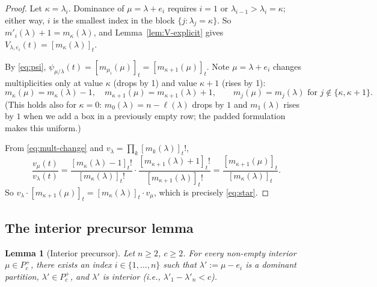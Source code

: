\documentclass[11pt]{article}
\newtheorem{lemma}[theorem]{Lemma}
\theoremstyle{definition}
\newcommand{\Pcp}{P_c^+}
\begin{document}
\begin{proof}
Let $\kappa = \lambda_i$. Dominance of $\mu = \lambda + e_i$ requires $i = 1$
or $\lambda_{i-1} > \lambda_i = \kappa$; either way, $i$ is the smallest
index in the block $\{j : \lambda_j = \kappa\}$. So
$m'_i(\lambda) + 1 = m_\kappa(\lambda)$, and Lemma~\ref{lem:V-explicit}
gives $V_{\lambda, e_i}(t) = [m_\kappa(\lambda)]_t$.

By \eqref{eq:psi}, $\psi_{\mu/\lambda}(t) = [m_{\mu_i}(\mu)]_t = [m_{\kappa+1}(\mu)]_t$.
Note $\mu = \lambda + e_i$ changes multiplicities only at value $\kappa$ (drops by 1)
and value $\kappa+1$ (rises by 1):
\begin{equation}
m_\kappa(\mu) = m_\kappa(\lambda) - 1,\quad m_{\kappa+1}(\mu) = m_{\kappa+1}(\lambda) + 1,
\qquad m_j(\mu) = m_j(\lambda) \text{ for } j \notin \{\kappa,\kappa+1\}.
\label{eq:mult-change}
\end{equation}
(This holds also for $\kappa = 0$: $m_0(\lambda) = n - \ell(\lambda)$ drops
by $1$ and $m_1(\lambda)$ rises by $1$ when we add a box in a previously
empty row; the padded formulation makes this uniform.)

From \eqref{eq:mult-change} and $v_\lambda = \prod_k [m_k(\lambda)]_t!$,
\[
\frac{v_\mu(t)}{v_\lambda(t)}
= \frac{[m_\kappa(\lambda)-1]_t!}{[m_\kappa(\lambda)]_t!} \cdot \frac{[m_{\kappa+1}(\lambda)+1]_t!}{[m_{\kappa+1}(\lambda)]_t!}
= \frac{[m_{\kappa+1}(\mu)]_t}{[m_\kappa(\lambda)]_t}.
\]
So $v_\lambda \cdot [m_{\kappa+1}(\mu)]_t = [m_\kappa(\lambda)]_t \cdot v_\mu$,
which is precisely \eqref{eq:star}.
\end{proof}

\subsection{The interior precursor lemma}

\begin{lemma}[Interior precursor]
\label{lem:precursor}
Let $n \ge 2$, $c \ge 2$. For every non-empty interior $\mu \in \Pcp$,
there exists an index $i \in \{1,\ldots,n\}$ such that $\lambda' := \mu - e_i$
is a dominant partition, $\lambda' \in \Pcp$, and $\lambda'$ is interior
(i.e., $\lambda'_1 - \lambda'_n < c$).
\end{lemma}
\end{document}

